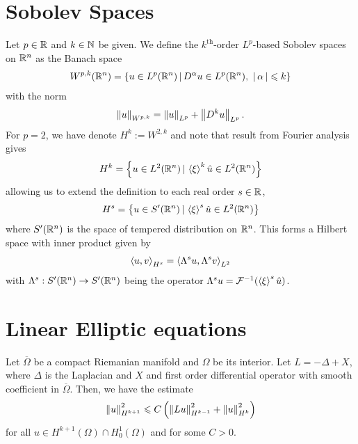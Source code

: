 \documentclass{article}
\begin{document}
\section{Sobolev Spaces \cite[Chapter 4]{taylor_pde}}
\begin{fdefinition} Let $p \in \R$ and $k \in \N$ be given. We define the $k^{\text{th}}$-order $L^p$-based Sobolev spaces on $\R^n$ as the Banach space
\begin{align*}
W^{p, k}(\R^n) = \set{u \in L^p(\R^n) \wh D^\alpha u \in L^p(\R^n), \, \, \abs{\alpha} \leq k }
\end{align*}
with the norm
\begin{align*}
\norm[u]_{W^{p, k}} = \norm[u]_{L^p} + \norm[D^k u]_{L^p}. 
\end{align*}
For $p = 2$, we have denote $H^k := W^{2, k}$ and note that result from Fourier analysis gives
\begin{align*}
H^k = \set{u \in L^2(\R^n) \wh \abrac{\xi}^k \hat{u} \in L^2(\R^n)}
\end{align*}
allowing us to extend the definition to each real order $s \in \R$, 
\begin{align*}
H^s = \set{u \in S'(\R^n) \wh \abrac{\xi}^s \hat{u} \in L^2(\R^n)}
\end{align*}
where $S'(\R^n)$ is the space of tempered distribution on $\R^n$. This forms a Hilbert space with inner product given by
\begin{align*}
\inprod[u, v]_{H^s} = \inprod[ \Lambda^su, \Lambda^sv]_{L^2}
\end{align*}
with $\Lambda^s: S'(\R^n) \to S'(\R^n)$ being the operator $\Lambda^su = \F^{-1}(\abrac{\xi}^s \hat{u})$. 
\end{fdefinition}



\section{Linear Elliptic equations \cite[Chapter 5]{taylor_pde}}
\begin{ftheorem} Let $\overline{\Omega}$ be a compact Riemanian manifold and $\Omega$ be its interior. Let $L = -\Delta + X$, where $\Delta$ is the Laplacian and $X$ and first order differential operator with smooth coefficient in $\overline{\Omega}$. Then, we have the estimate
\begin{align*}
\norm[u]_{H^{k +1}}^2 \leq C \brac{\norm[Lu]_{H^{k -1}}^2 + \norm[u]_{H^k}^2}
\end{align*}
for all $u \in H^{k + 1}(\Omega) \cap H^1_0(\Omega)$ and for some $C > 0$. 
\end{ftheorem}







\end{document}
